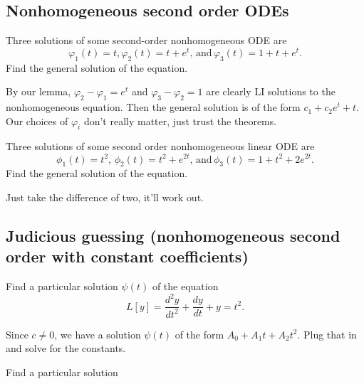 \subsection{Nonhomogeneous second order ODEs}
\begin{prob}
    Three solutions of some second-order nonhomogeneous ODE are \[
        \varphi_1 (t)=t, \varphi_2(t)=t+e^{t},\,\text{and}\, \varphi_3(t)=1+t+e^{t}.  
    \] Find the general solution of the equation.
\end{prob}
\begin{solution}
    By our lemma, $\varphi_2-\varphi_1=e^{t}  $ and $\varphi_3-\varphi_2=1  $ are clearly LI solutions to the nonhomogeneous equation. Then the general solution is of the form $c_1+c_2e^{t}+t$. Our choices of $\varphi_i $ don't really matter, just trust the theorems.
\end{solution}
\begin{prob}
    Three solutions of some second order nonhomogeneous linear ODE are \[
        \phi_1(t)=t^2,\,\phi_2(t)=t^2+e^{2t},\,\text{and}\,\phi_3(t)=1+t^2+2e^{2t}.
    \] Find the general solution of the equation.
\end{prob}
\begin{solution}
    Just take the difference of two, it'll work out.
\end{solution}
\subsection{Judicious guessing (nonhomogeneous second order with constant coefficients)}
\begin{prob}
    Find a particular solution $\psi(t)$ of the equation \[
        L[y]=\frac{d^2y}{dt^2}+\frac{dy}{dt}+y=t^2.
    \] 
\end{prob}
\begin{solution}
    Since $c\neq 0$, we have a solution $\psi(t)$ of the form $A_0+A_1t+A_2t^2$. Plug that in and solve for the constants.
\end{solution}
\begin{prob}
    Find a particular solution 
\end{prob}
